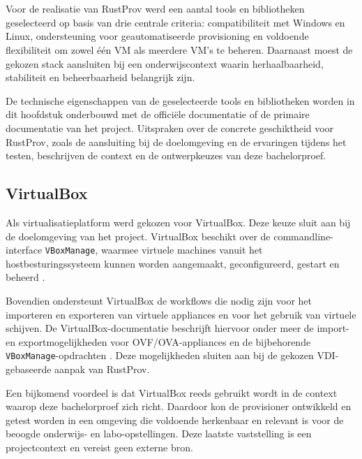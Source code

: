 \chapter{}
\label{ch:toolselectie}

Voor de realisatie van RustProv werd een aantal tools en bibliotheken geselecteerd op basis van drie centrale criteria: compatibiliteit met Windows en Linux, ondersteuning voor geautomatiseerde provisioning en voldoende flexibiliteit om zowel één VM als meerdere VM's te beheren. Daarnaast moest de gekozen stack aansluiten bij een onderwijscontext waarin herhaalbaarheid, stabiliteit en beheerbaarheid belangrijk zijn.

De technische eigenschappen van de geselecteerde tools en bibliotheken worden in dit hoofdstuk onderbouwd met de officiële documentatie of de primaire documentatie van het project. Uitspraken over de concrete geschiktheid voor RustProv, zoals de aansluiting bij de doelomgeving en de ervaringen tijdens het testen, beschrijven de context en de ontwerpkeuzes van deze bachelorproef.

\section{VirtualBox}

Als virtualisatieplatform werd gekozen voor VirtualBox. Deze keuze sluit aan bij de doelomgeving van het project. VirtualBox beschikt over de commandline-interface \texttt{VBoxManage}, waarmee virtuele machines vanuit het hostbesturingssysteem kunnen worden aangemaakt, geconfigureerd, gestart en beheerd \autocite{Oracle2022}.

Bovendien ondersteunt VirtualBox de workflows die nodig zijn voor het importeren en exporteren van virtuele appliances en voor het gebruik van virtuele schijven. De VirtualBox-documentatie beschrijft hiervoor onder meer de import- en exportmogelijkheden voor OVF/OVA-appliances en de bijbehorende \texttt{VBoxManage}-opdrachten \autocite{OracleVirtualBox2024}. Deze mogelijkheden sluiten aan bij de gekozen VDI-gebaseerde aanpak van RustProv.

Een bijkomend voordeel is dat VirtualBox reeds gebruikt wordt in de context waarop deze bachelorproef zich richt. Daardoor kon de provisioner ontwikkeld en getest worden in een omgeving die voldoende herkenbaar en relevant is voor de beoogde onderwijs- en labo-opstellingen. Deze laatste vaststelling is een projectcontext en vereist geen externe bron.

